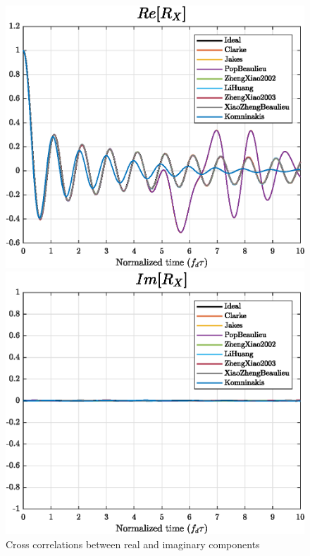 \begin{figure}
	\vspace{2mm}
	
	\hfill
	\begin{minipage}{.49\linewidth}
		\includegraphics[width=\linewidth]{img/ReX.eps}
	\end{minipage}
	\hfill
	\begin{minipage}{.49\linewidth}
		\includegraphics[width=\linewidth]{img/ImX.eps}
	\end{minipage}
	\hfill
	
	\caption{Cross correlations between real and imaginary components}
	\label{fig:xcorrs}
\end{figure}

